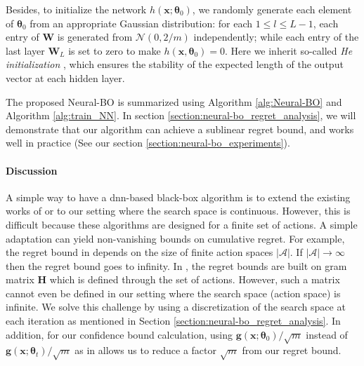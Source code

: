 
Besides, to initialize the network $h(\mathbf{x}; \boldsymbol{\theta}_0)$, we randomly generate each element of $\boldsymbol{\theta}_0$ from an appropriate Gaussian distribution: for each $1 \leq l \leq L-1$, each entry of $\mathbf{W}$ is generated from $\mathcal N(0, 2/m)$ independently; while each entry of the last layer $\mathbf{W}_L$ is set to zero to make $h(\mathbf{x}, \boldsymbol{\theta}_0) = 0$. Here we inherit so-called \emph{He initialization} \citep{he2015delving}, which ensures the stability of the expected length of the output vector at each hidden layer. 

The proposed Neural-BO is summarized using Algorithm \ref{alg:Neural-BO} and Algorithm \ref{alg:train_NN}. In section \ref{section:neural-bo_regret_analysis}, we will demonstrate that our algorithm can achieve a sublinear regret bound, and works well in practice (See our section \ref{section:neural-bo_experiments}).
\paragraph{Discussion}
A simple way to have a \ac{dnn}-based black-box algorithm is to extend the existing works of \citet{zhou2020neural,zhang2021neural} or \citet{kassraie2022neural} to our setting where the search space is continuous. However, this is difficult because these algorithms are designed for a finite set of actions. A simple adaptation can yield non-vanishing bounds on cumulative regret. For example, the regret bound in \citet{kassraie2022neural} depends on the size of finite action spaces $\lvert \mathcal A \rvert$. If $\lvert \mathcal A \rvert \rightarrow \infty$ then the regret bound goes to infinity. In \citet{zhou2020neural,zhang2021neural}, the regret bounds are built on gram matrix $\mathbf{H}$ which is defined through the set of actions. However, such a matrix cannot even be defined in our setting where the search space (action space) is infinite. We solve this challenge by using a discretization of the search space at each iteration as mentioned in Section \ref{section:neural-bo_regret_analysis}. In addition, for our confidence bound calculation, using $\mathbf{g}(\mathbf{x};\boldsymbol{\theta}_0)/\sqrt{m}$ instead of $\mathbf{g}(\mathbf{x};\boldsymbol{\theta}_t)/\sqrt{m}$ as in \citet{zhou2020neural,zhang2021neural} allows us to reduce a factor $\sqrt{m}$ from our regret bound.    

